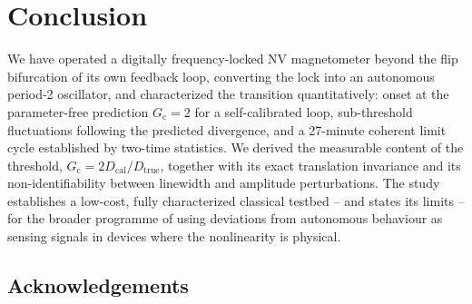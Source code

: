 \documentclass[11pt,a4paper]{article}
\newcommand{\Gc}{G_{\mathrm{c}}}
\newcommand{\Dcal}{D_{\mathrm{cal}}}
\newcommand{\Dtrue}{D_{\mathrm{true}}}
\begin{document}
\section{Conclusion}
\label{sec:conclusion}

We have operated a digitally frequency-locked NV magnetometer beyond the flip
bifurcation of its own feedback loop, converting the lock into an autonomous
period-2 oscillator, and characterized the transition quantitatively: onset at
the parameter-free prediction $\Gc = 2$ for a self-calibrated loop,
sub-threshold fluctuations following the predicted divergence, and a
27-minute coherent limit cycle established by two-time statistics. We derived
the measurable content of the threshold, $\Gc = 2\Dcal/\Dtrue$, together with
its exact translation invariance and its non-identifiability between
linewidth and amplitude perturbations. The study establishes a low-cost,
fully characterized classical testbed -- and states its limits -- for the
broader programme of using deviations from autonomous behaviour as sensing
signals in devices where the nonlinearity is physical.

\subsection*{Acknowledgements}
\end{document}
